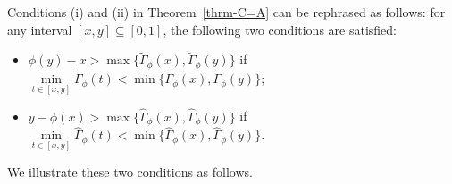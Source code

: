 \documentclass[12pt]{article}
\theoremstyle{plain}
\theoremstyle{definition}
\begin{document}
Conditions (i) and (ii) in Theorem~\ref{thrm-C=A} can be rephrased as follows:
for any interval $[x, y]\subseteq[0, 1]$, the following two conditions are satisfied:
\begin{itemize}%
\item[\rm (i)] $\phi(y)-x>\max\{\tilde{\Gamma}_\phi(x), \tilde{\Gamma}_\phi(y)\}$ if $\min\limits_{t\in [x, y]}\tilde{\Gamma}_\phi(t)<\min\{\tilde{\Gamma}_\phi(x), \tilde{\Gamma}_\phi(y)\}$;

\item[\rm (ii)] $y-\phi(x)>\max\{\hat{\Gamma}_\phi(x), \hat{\Gamma}_\phi(y)\}$ if $\min\limits_{t\in [x, y]}\hat{\Gamma}_\phi(t)<\min\{\hat{\Gamma}_\phi(x), \hat{\Gamma}_\phi(y)\}$.
\end{itemize}

We illustrate these two conditions as follows.
\end{document}
